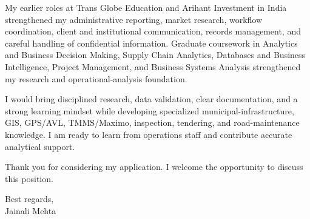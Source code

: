 \documentclass[letterpaper,10pt]{article}
\begin{document}
My earlier roles at Trans Globe Education and Arihant Investment in India strengthened my administrative reporting, market research, workflow coordination, client and institutional communication, records management, and careful handling of confidential information. Graduate coursework in Analytics and Business Decision Making, Supply Chain Analytics, Databases and Business Intelligence, Project Management, and Business Systems Analysis strengthened my research and operational-analysis foundation.

I would bring disciplined research, data validation, clear documentation, and a strong learning mindset while developing specialized municipal-infrastructure, GIS, GPS/AVL, TMMS/Maximo, inspection, tendering, and road-maintenance knowledge. I am ready to learn from operations staff and contribute accurate analytical support.

Thank you for considering my application. I welcome the opportunity to discuss this position.

Best regards,\\[8pt]
Jainali Mehta
\end{document}
